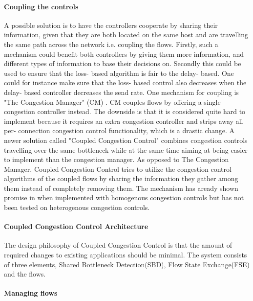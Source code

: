 \documentclass[UKenglish]{ifimaster}
\begin{document}
\paragraph{Coupling the controls}
A possible solution is to have the controllers cooperate by sharing their information, given that they are both located on the same host and are travelling the same path across the network i.e. coupling the flows.
Firstly, such a mechanism could benefit both controllers by giving them more information, and different types of information to base their decisions on. 
Secondly this could be used to ensure that the loss- based algorithm is fair to the delay- based.
One could for instance make sure that the loss- based control also decreases when the delay- based controller decreases the send rate.
One mechanism for coupling is "The Congestion Manager" (CM) \cite{rfc3124}.
CM couples flows by offering a single congestion controller instead.
The downside is that it is considered quite hard to implement because it requires an extra congestion controller and strips away all per- connection congestion control functionality, which is a drastic change.
A newer solution called "Coupled Congestion Control" \cite{rfc8699} combines congestion controls travelling over the same bottleneck while at the same time aiming at being easier to implement than the congestion manager.
As opposed to The Congestion Manager, Coupled Congestion Control tries to utilize the congestion control algorithms of the coupled flows by sharing the information they gather among them instead of completely removing them. 
The mechanism has aready shown promise in \cite{10.1145/2740070.2630089, 7502803} when implemented with homogenous congestion controls but has not been tested on heterogenous congestion controls. 
\paragraph{Coupled Congestion Control Architecture}
The design philosophy of Coupled Congestion Control is that the amount of required changes to existing applications should be minimal. 
The system consists of three elements, Shared Bottleneck Detection(SBD), Flow State Exchange(FSE) and the flows. 

\paragraph{Managing flows}
\end{document}
